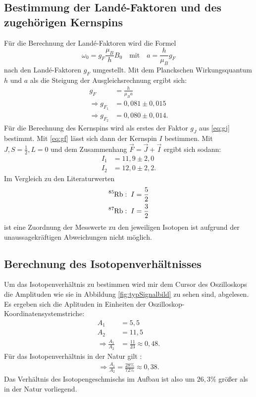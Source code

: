 \subsection{Bestimmung der Landé-Faktoren und des zugehörigen Kernspins}
Für die Berechnung der Landé-Faktoren wird die Formel
\begin{equation}
  \omega_0=g_F\frac{\mu_B}{h}B_0\quad \text{mit}\quad a=\frac{h}{\mu_B}{g_F}
\end{equation}
nach den Landé-Faktoren $g_F$ umgestellt. Mit dem Planckschen Wirkungsquantum $h$ und $a$ als die Steigung der Ausgleichsrechnung ergibt sich:
\begin{align*}
  g_F&=\frac{h}{\mu_Ba}\\
  \Rightarrow g_{F_1}&= 0,081 \pm 0,015\\
  \Rightarrow g_{F_2}&= 0,080 \pm 0,014.
\end{align*}
Für die Berechnung des Kernspins wird als erstes der Faktor $g_J$ aus \eqref{eq:gj} bestimmt. Mit \eqref{eq:gf} lässt sich dann der Kernspin $I$ bestimmen. Mit $J,S=\frac{1}{2}, L=0$ \cite{anleitung} und dem Zusammenhang $\vec{F}=\vec{J}+\vec{I}$ ergibt sich sodann:
\begin{align*}
  I_1&= 11,9\pm2,0\\
  I_2&=12,0\pm2,2.
\end{align*}
Im Vergleich zu den Literaturwerten \cite{rubidium}
\begin{align*}
  \ce{^{85}Rb}&:\; I=\frac{5}{2}\\
  \ce{^{87}Rb}&:\; I=\frac{3}{2}
\end{align*}
ist eine Zuordnung der Messwerte zu den jeweiligen Isotopen ist aufgrund der unaussagekräftigen Abweichungen nicht möglich.
\subsection{Berechnung des Isotopenverhältnisses}
Um das Isotopenverhältnis zu bestimmen wird mir dem Cursor des Oszilloskops die Amplituden wie sie in Abbildung \ref{fig:typSignalbild} zu sehen sind, abgelesen.
Es ergeben sich die Aplituden in Einheiten der Oszilloskop-Koordinatensystemstriche:
\begin{align*}
A_1&= 5,5\\
A_2&= 11,5\\
\Rightarrow \frac{A_1}{A_2}&=\frac{11}{23}\approx 0,48.
\end{align*}
Für das Isotopenverhältnis in der Natur gilt \cite{rubidium}:
\begin{align*}
\Rightarrow \frac{A_1}{A_2}=\frac{28\%}{72\%}\approx 0,38.
\end{align*}
Das Verhältnis des Isotopengeschmischs im Aufbau ist also um $26,3\%$ größer als in der Natur vorliegend.
